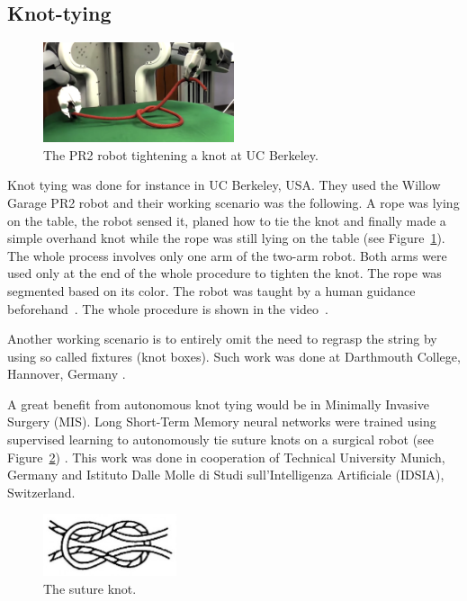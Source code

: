     \subsection{Knot-tying}
        
        \begin{figure}[h]
        \includegraphics[width=0.5\textwidth]{PR2Knot.png}
        \centering
        \caption{The PR2 robot tightening a knot at UC Berkeley.}
        \label{fig:PR2Knot}
        \end{figure}

        Knot tying was  done for instance in UC Berkeley, USA. They used the Willow Garage PR2 robot and their working scenario was the following. A rope was lying on the table, the robot sensed it, planed how to tie the knot and finally made a simple overhand knot while the rope was still lying on the table (see Figure~\ref{fig:PR2Knot}). The whole process involves only one arm of the two-arm robot. Both arms were used only at the end of the whole procedure to tighten the knot. The rope was segmented based on its color. The robot was taught by a human guidance beforehand~\cite{UCBerkeleyOverhandKnotArticle}. The whole procedure is shown in the video~\cite{UCBerkeleyOverhandKnotVideo}.

        Another working scenario is to entirely omit the need to regrasp the string by using so called fixtures (knot boxes). Such work was done at Darthmouth College, Hannover, Germany \cite{FixtureKnotTying}.

        A great benefit from autonomous knot tying would be in Minimally Invasive Surgery (MIS).  Long Short-Term Memory neural networks were trained using supervised learning to autonomously tie suture knots on a surgical robot (see Figure~\ref{fig:SutureKnot}) \cite{SutureKnotTying}. This work was done in cooperation of Technical University Munich, Germany and Istituto Dalle Molle di Studi sull’Intelligenza Artificiale (IDSIA), Switzerland.

        \begin{figure}
        \includegraphics[width=0.35\textwidth]{SutureKnot2.png}
        \centering
        \caption{The suture knot.}
        \label{fig:SutureKnot}
        \end{figure}


